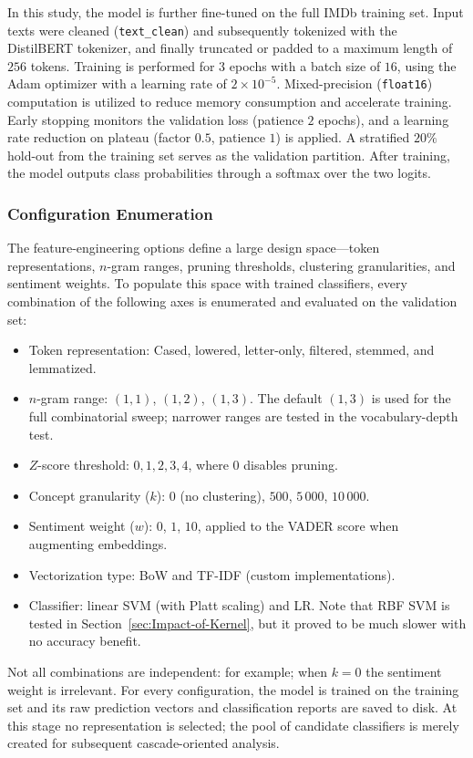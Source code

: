 \documentclass[a4paper,fleqn]{cas-dc}
\newcommand{\zscore}{Z}
\newcommand{\logreg}{LR}
\newcommand{\code}[1]{\texttt{#1}}
\newcommand{\kconcepts}{k}
\newcommand{\weightparam}{w}
\begin{document}
In this study, the model is further fine-tuned on the full IMDb training set. Input texts were cleaned (\code{text\_clean}) and subsequently tokenized with the DistilBERT tokenizer, and finally truncated or padded to a maximum length of $256$ tokens. Training is performed for $3$ epochs with a batch size of $16$, using the Adam optimizer with a learning rate of $2 \times 10^{-5}$. Mixed-precision (\code{float16}) computation is utilized to reduce memory consumption and accelerate training. Early stopping monitors the validation loss (patience $2$ epochs), and a learning rate reduction on plateau (factor $0.5$, patience $1$) is applied. A stratified $20\%$ hold-out from the training set serves as the validation partition. After training, the model outputs class probabilities through a softmax over the two logits.

\subsubsection{Configuration Enumeration}
\label{sec:config_enum}

The feature-engineering options define a large design space---token representations, $n$-gram ranges, pruning thresholds, clustering granularities, and sentiment weights. To populate this space with trained classifiers, every combination of the following axes is enumerated and evaluated on the validation set:

\begin{itemize}
	\item {Token representation:} Cased, lowered, letter-only, filtered, stemmed, and lemmatized.
	\item {$n$-gram range:} $(1,1)$, $(1,2)$, $(1,3)$. The default $(1,3)$ is used for the full combinatorial sweep; narrower ranges are tested in the vocabulary-depth test.
	\item {$\zscore$-score threshold:} $0,1,2,3,4$, where $0$ disables pruning.
	\item {Concept granularity ($k$):} $0$ (no clustering), $500$, $5\,000$, $10\,000$.
	\item {Sentiment weight ($\weightparam$):} $0$, $1$, $10$, applied to the VADER score when augmenting embeddings.
	\item {Vectorization type:} BoW and TF-IDF (custom implementations).
	\item {Classifier:} linear SVM (with Platt scaling) and \logreg{}. Note that RBF SVM is tested in Section~\ref{sec:Impact-of-Kernel}, but it proved to be much slower with no accuracy benefit.
\end{itemize}
Not all combinations are independent: for example; when $\kconcepts=0$ the sentiment weight is irrelevant. For every configuration, the model is trained on the training set and its raw prediction vectors and classification reports are saved to disk. At this stage no representation is selected; the pool of candidate classifiers is merely created for subsequent cascade-oriented analysis. 
\end{document}
